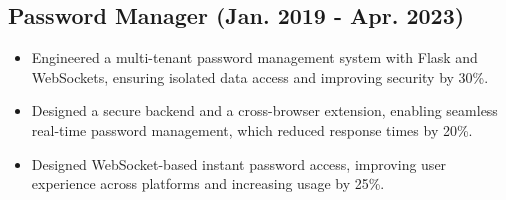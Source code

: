 \documentclass[a4paper,9pt]{article}
\begin{document}
\subsection*{Password Manager (Jan. 2019 - Apr. 2023)}
\begin{itemize}
    \item Engineered a multi-tenant password management system with Flask and WebSockets, ensuring isolated data access and improving security by 30\%.
    \item Designed a secure backend and a cross-browser extension, enabling seamless real-time password management, which reduced response times by 20\%.
    \item Designed WebSocket-based instant password access, improving user experience across platforms and increasing usage by 25\%.
\end{itemize}
\end{document}
